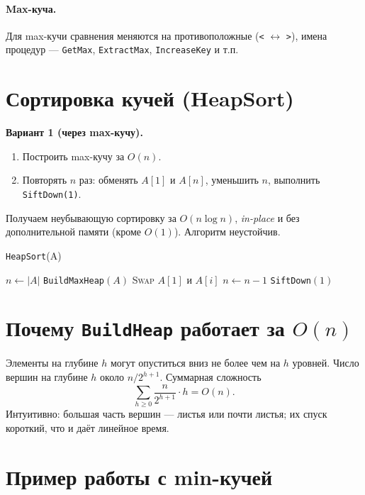 \documentclass[12pt,a4paper]{article}
\begin{document}
\paragraph{Max-куча.} Для max-кучи сравнения меняются на противоположные (\texttt{<} $\leftrightarrow$ \texttt{>}), имена процедур --- \texttt{GetMax}, \texttt{ExtractMax}, \texttt{IncreaseKey} и т.п.

\section{Сортировка кучей (HeapSort)}

\textbf{Вариант 1 (через max-кучу).}
\begin{enumerate}[noitemsep, topsep=2pt]
  \item Построить max-кучу за $O(n)$.
  \item Повторять $n$ раз: обменять $A[1]$ и $A[n]$, уменьшить $n$, выполнить \texttt{SiftDown(1)}.
\end{enumerate}
Получаем неубывающую сортировку за $O(n\log n)$, \emph{in-place} и без дополнительной памяти (кроме $O(1)$). Алгоритм неустойчив.

\begin{algorithm}[H]
\caption{\texttt{HeapSort}(A)}
\begin{algorithmic}[1]
\State $n \gets |A|$
\State \texttt{BuildMaxHeap}$(A)$ 
  \State \textsc{Swap} $A[1]$ и $A[i]$
  \State $n \gets n - 1$
  \State \texttt{SiftDown}$(1)$ 
\EndFor
\end{algorithmic}
\end{algorithm}

\section{Почему \texttt{BuildHeap} работает за $O(n)$}

Элементы на глубине $h$ могут опуститься вниз не более чем на $h$ уровней. Число вершин на глубине $h$ около $n/2^{h+1}$. Суммарная сложность
\[
\sum_{h\ge 0} \frac{n}{2^{h+1}} \cdot h = O(n).
\]
Интуитивно: большая часть вершин --- листья или почти листья; их спуск короткий, что и даёт линейное время.

\section{Пример работы с min-кучей}
\end{document}
